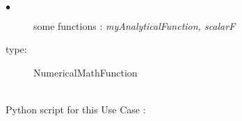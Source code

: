 \textspace\\

             {
               \begin{description}
               \item[$\bullet$] some functions : {\itshape myAnalyticalFunction, scalarF}
               \item[type:] NumericalMathFunction
               \end{description}
             }

             \textspace\\
             Python script for this Use Case :

